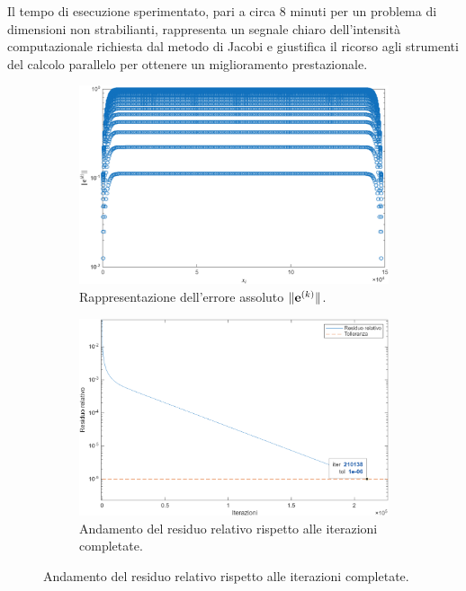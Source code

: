 Il tempo di esecuzione sperimentato, pari a circa $\num{8}$ minuti per un problema di dimensioni non strabilianti, rappresenta un segnale chiaro 
dell'intensit\`a computazionale richiesta dal metodo di Jacobi e giustifica il ricorso agli strumenti del calcolo parallelo per ottenere un miglioramento prestazionale.
\begin{figure}[!htbp]
    \centering
    \begin{subfigure}{0.58\textwidth}
        \centering
        \includegraphics[width=\linewidth]{../Risorse/Capitolo 3/erroreAssolutoJacobi1.png}
        \caption{Rappresentazione dell'errore assoluto $\lVert\mathbf{e}^{(k)}\rVert$.}
        \label{fig:erroreAssolutoJacobi1}
    \end{subfigure}

    \vspace{1.5em}

    \begin{subfigure}{0.58\textwidth}
        \centering
        \includegraphics[width=\linewidth]{../Risorse/Capitolo 3/evoluzioneResiduoRelativo.png}
        \caption{Andamento del residuo relativo rispetto alle iterazioni completate.}
        \label{fig:evoluzioneResiduoRelativo}
    \end{subfigure}


\end{figure}
